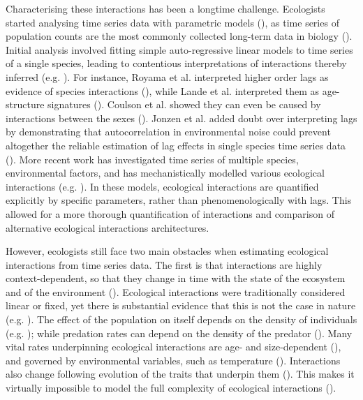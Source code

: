 \documentclass[11pt, oneside]{article}
\begin{document}
Characterising these interactions has been a longtime challenge. 
Ecologists started analysing time series data with parametric models (\cite{Royama1984,Kendall1999,Ives2003,Gross2005}), as time series of population counts are the most commonly collected long-term data in biology (\cite{Kendall1999}).
Initial analysis involved fitting simple auto-regressive linear models to time series of a single species, leading to contentious interpretations of interactions thereby inferred (e.g. \cite{Berryman1997}). 
For instance, Royama et al. interpreted higher order lags as evidence of species interactions (\cite{Royama1984}), while Lande et al. interpreted them as age-structure signatures (\cite{Lande2002}). 
Coulson et al. showed they can even be caused by interactions between the sexes (\cite{Mysterud2002}).
Jonzen et al. added doubt over interpreting lags by demonstrating that autocorrelation in environmental noise could prevent altogether the reliable estimation of lag effects in single species time series data (\cite{Jonzen2002}).
More recent work has investigated time series of multiple species, environmental factors, and has mechanistically modelled various ecological interactions (e.g. \cite{Bruijning2019,Rosenbaum2019,Adams2020}).
In these models, ecological interactions are quantified explicitly by specific parameters, rather than phenomenologically with lags.
This allowed for a more thorough quantification of interactions and comparison of alternative ecological interactions architectures.

However, ecologists still face two main obstacles when estimating ecological interactions from time series data.
The first is that interactions are highly context-dependent, so that they change in time with the state of the ecosystem and of the environment (\cite{Song2020}).
Ecological interactions were traditionally considered linear or fixed, yet there is substantial evidence that this is not the case in nature (e.g. \cite{Bonsall2003,Gross2005,Kendall2005,Ushio2018,Bruijning2019,Rosenbaum2019,Bonnaffe2021b}).
The effect of the population on itself depends on the density of individuals (e.g. \cite{Lingjaerde2001, Moe2005, Brook2006}); while predation rates can depend on the density of the predator (\cite{Jost2000,Yoshida2003}).
Many vital rates underpinning ecological interactions are age- and size-dependent (\cite{Bonnaffe2018,Bonnaffe2021b}), and governed by environmental variables, such as temperature (\cite{Brown2004a}).
Interactions also change following evolution of the traits that underpin them (\cite{Turchin2003,Yoshida2003}).
This makes it virtually impossible to model the full complexity of ecological interactions (\cite{Lawton1999,Kendall1999}).
\end{document}
